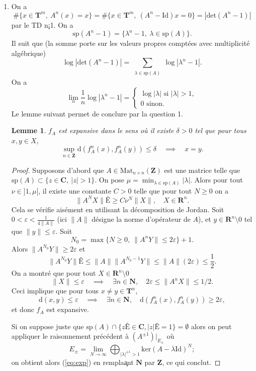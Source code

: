 \documentclass[a4paper,12pt,openany]{article}
\theoremstyle{plain}
\newtheorem{lem}{Lemme}
\theoremstyle{definition}
\newcommand{\dd}{\mathrm{d}}
\newcommand{\T}{\mathbf{T}}
\newcommand{\R}{\mathbf{R}}
\newcommand{\Z}{\mathbf{Z}}
\newcommand{\N}{\mathbf{N}}
\newcommand{\C}{\mathbf{C}}
\begin{document}
\begin{enumerate}
\item On a
$$
\#\{ x \in \T^m,~A^n(x) = x\} = \#\{x \in \T^m,~(A^n-\mathrm{Id})x = 0\} = |\mathrm{det}(A^n-1)|
$$
par le TD n¡1. On a 
$$
\mathrm{sp}(A^n-1) = \{ \lambda^n - 1,~\lambda \in \mathrm{sp}(A)\}.
$$
 Il suit que (la somme porte sur les valeurs propres compt\'ees avec multiplicit\'e alg\'ebrique)
 $$
\log|\mathrm{det} (A^n-1)| = \sum_{\substack{\lambda \in \mathrm{sp}(A)}} \log |\lambda^n-1|.
$$
On a
$$
\lim_n \frac{1}{n} \log |\lambda^n-1| = \left\{\begin{matrix} \log |\lambda| \text{ si }|\lambda| > 1, \\ 0 \text{ sinon.}
\end{matrix} \right.
$$
Le lemme suivant permet de conclure par la question 1.
\begin{lem}
$f_A$ est expansive dans le sens o\`u il existe $\delta > 0$ tel que pour tous $x,y \in X$,
$$
\sup_{n \in \Z} \dd(f^n_A(x), f^n_A(y)) \leq \delta \quad \implies \quad x = y.
$$
\end{lem}
\begin{proof}
Supposons d'abord que $A \in \mathrm{Mat}_{n \times n}(\Z)$ est une matrice telle que $\mathrm{sp}(A) \subset \{z \in \C,~|z|> 1\}$. On pose $\mu = \min_{\lambda \in \mathrm{sp}(A)} |\lambda|$. Alors pour tout $\nu \in ]1, \mu[$, il existe une constante $C > 0$ telle que pour tout $N \geq 0$ on a 
$$
\|A^NX \|Ê\geq C \nu^N \|X\|, \quad X \in \R^n.
$$
Cela se v\'erifie ais\'ement en utilisant la d\'ecomposition de Jordan. Soit $0 < \varepsilon < \displaystyle{ \frac{1}{4 \|A\|}}$ (ici $\|A\|$ d\'esigne la norme d'op\'erateur de $A$), et $y \in \R^n \setminus 0$ tel que $\|y \|\leq \varepsilon.$ Soit 
$$N_0 = \max\{N \geq 0,~\|A^nY\|\leq 2 \varepsilon\} + 1.$$
Alors $\|A^{N_0}Y\| \geq 2 \varepsilon$ et 
$$
\|A^{N_0}Y\|Ê\leq \|A\|\|A^{N_0-1}Y\|\leq \|A\| (2\varepsilon) \leq \frac{1}{2}.
$$
On a montr\'e que pour tout $X \in \R^{n}\setminus 0$
$$
 \|X\|\leq \varepsilon \quad \implies \quad \exists n \in \N, \quad 2\varepsilon \leq \|A^nX\| \leq 1/2.
$$
Ceci implique que pour tous $x\neq y \in \T^n$,
\begin{equation}\label{eq:exp}
\dd(x, y) \leq \varepsilon \quad \implies \quad \exists n \in \N, \quad \dd(f^n_A(x), f^n_A(y)) \geq 2\varepsilon,
\end{equation}
et donc $f_A$ est expansive.

Si on suppose juste que $\mathrm{sp}(A) \cap \{zÊ\in \C, |z|Ê= 1\} = \emptyset$ alors on peut appliquer le raisonnement pr\'ec\'edent \`a $(A^{\pm 1})|_{E_\pm}$ o\`u
$$
E_\pm = \lim_{N \to \infty} \bigoplus_{|\lambda|^{\pm 1} > 1} \mathrm{ker}(A - \lambda\mathrm{Id})^N ;
$$
on obtient alors (\ref{eq:exp}) en rempla\c ant $\N$ par $\Z$, ce qui conclut.
\end{proof}
\end{enumerate}
\end{document}
